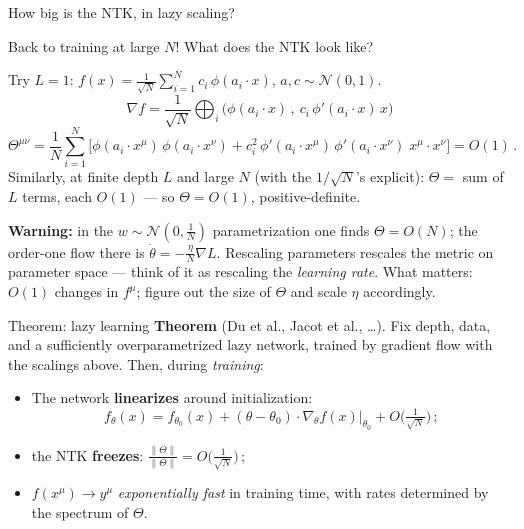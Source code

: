 \documentclass[11pt]{beamer}
\newcommand{\hl}[1]{{\color{blue!60!black}\textbf{#1}}}
\begin{document}
\begin{frame}{How big is the NTK, in lazy scaling?}

Back to training at large $N$! What does the NTK look like?  \pause

\medskip

  Try $L = 1$:\quad
  $\displaystyle f(x) = \frac{1}{\sqrt N}\sum_{i=1}^N c_i\,\phi(a_i\cdot x)$,
  \quad $a, c \sim \mathcal N(0,1)$.  \pause
  \[
    \nabla f = \frac{1}{\sqrt N}\bigoplus_i \Big(\phi(a_i\cdot x)\,,\
    c_i\,\phi'(a_i\cdot x)\, x\Big)
  \]  \pause
  \vspace{-.3cm}
  {\small
  \[
    \Theta^{\mu\nu} = \frac1N \sum_{i=1}^N
    \Big[\phi(a_i\cdot x^\mu)\,\phi(a_i\cdot x^\nu)
    + c_i^2\,\phi'(a_i\cdot x^\mu)\,\phi'(a_i\cdot x^\nu)\;
    x^\mu\!\cdot x^\nu\Big] = O(1)\,.
  \]}  \pause
  Similarly, at finite depth $L$ and large $N$ (with the $1/\sqrt N$'s
  explicit): $\Theta = $ sum of $L$ terms, each $O(1)$ --- so
  $\Theta = O(1)$, positive-definite.  \pause
  \vspace{2mm}

  {\footnotesize \hl{Warning:} in the $w \sim \mathcal N(0, \frac1N)$ parametrization one
  finds $\Theta = O(N)$; the order-one flow there is
  $\dot\theta = -\frac{\eta}{N}\nabla L$. Rescaling parameters rescales
  the metric on parameter space --- think of it as rescaling the
  \emph{learning rate}. What matters: $O(1)$ changes in $f^\mu$; figure
  out the size of $\Theta$ and scale $\eta$ accordingly.}
\end{frame}

\begin{frame}{Theorem: lazy learning}
  \textbf{Theorem} (Du et al., Jacot et al., \dots). Fix depth, data,
  and a sufficiently overparametrized lazy network, trained by gradient
  flow with the scalings above. Then, during \emph{training}: \pause
  \begin{itemize}
    \item The network \hl{linearizes} around initialization:
      \[
        f_\theta(x) = f_{\theta_0}(x)
        + (\theta - \theta_0)\cdot \nabla_\theta f(x)\big|_{\theta_0}
        + O\Big(\tfrac{1}{\sqrt N}\Big)\,;
      \] \pause
    \item the NTK \hl{freezes}:
      $\displaystyle \frac{\|\dot\Theta\|}{\|\Theta\|} =
      O\Big(\frac{1}{\sqrt N}\Big)\,;$     \pause
    \medskip  
    \item $f(x^\mu) \to y^\mu$ \emph{exponentially fast} in training
      time, with rates determined by the spectrum of $\Theta$.
  \end{itemize}
\end{frame}
\end{document}
